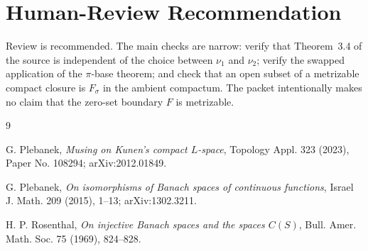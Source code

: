 \documentclass[11pt]{article}
\begin{document}
\section*{Human-Review Recommendation}

Review is recommended.  The main checks are narrow: verify that
Theorem~3.4 of the source is independent of the choice between $\nu_1$ and
$\nu_2$; verify the swapped application of the $\pi$-base theorem; and
check that an open subset of a metrizable compact closure is $F_\sigma$ in
the ambient compactum.  The packet intentionally makes no claim that the
zero-set boundary $F$ is metrizable.

\begin{thebibliography}{9}

G. Plebanek,
\emph{Musing on Kunen's compact $L$-space},
Topology Appl. 323 (2023), Paper No. 108294;
arXiv:2012.01849.

G. Plebanek,
\emph{On isomorphisms of Banach spaces of continuous functions},
Israel J. Math. 209 (2015), 1--13;
arXiv:1302.3211.

H. P. Rosenthal,
\emph{On injective Banach spaces and the spaces $C(S)$},
Bull. Amer. Math. Soc. 75 (1969), 824--828.

\end{thebibliography}
\end{document}
